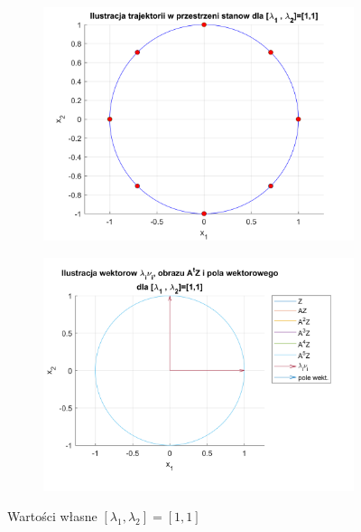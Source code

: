 \documentclass{article}
\begin{document}
\begin{figure}[H]
    \centering
    \begin{subfigure}{0.44\textwidth}
        \includegraphics[width=\textwidth]{portret_fazowy_10_10.png}
    \end{subfigure}
    \begin{subfigure}{0.48\textwidth}
        \includegraphics[width=\textwidth]{pole_wektorowe_10_10.png}
    \end{subfigure}
    \caption{Warto\'sci własne $[ \lambda_1, \lambda_2 ]= [ 1, 1 ]$}
    \label{fig::10i10}
\end{figure}
\end{document}

